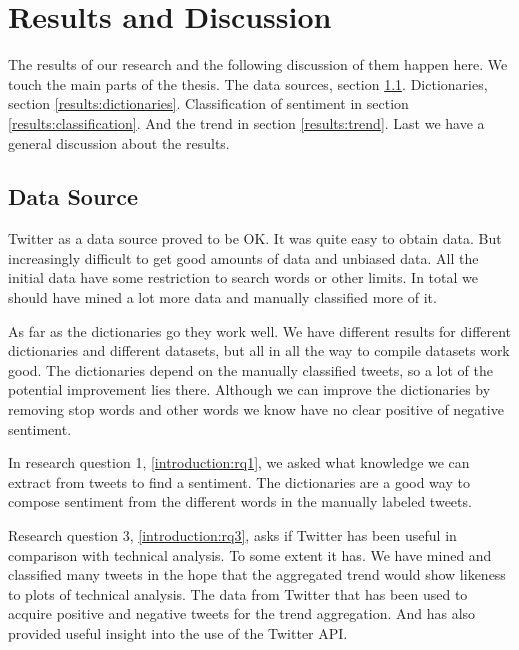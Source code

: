 \chapter{Results and Discussion}\label{results}

The results of our research and the following discussion of them happen here.
We touch the main parts of the thesis. The data sources, section
\ref{results:data_sources}. Dictionaries, section \ref{results:dictionaries}. Classification of sentiment in section
\ref{results:classification}. And the trend in section \ref{results:trend}.
Last we have a general discussion about the results. 
%

\section{Data Source}\label{results:data_sources}
Twitter as a data source proved to be OK. It was quite easy to obtain data. But
increasingly difficult to get good amounts of data and unbiased data. All the
initial data have some restriction to search words or other limits. In total we
should have mined a lot more data and manually classified more of it. 

As far as the dictionaries go they work well. We have different results for
different dictionaries and different datasets, but all in all the way to
compile datasets work good. The dictionaries depend on the manually classified
tweets, so a lot of the potential improvement lies there. Although we can
improve the dictionaries by removing stop words and other words we know have no
clear positive of negative sentiment. 

In research question 1, \ref{introduction:rq1}, we asked what knowledge we can
extract from tweets to find a sentiment. The dictionaries are a good way to
compose sentiment from the different words in the manually labeled tweets.

Research question 3, \ref{introduction:rq3}, asks if Twitter has been useful in
comparison with technical analysis. To some  extent it has. We have mined and
classified many tweets in the hope that the aggregated trend would show
likeness to plots of technical analysis. The data from Twitter that has been
used to acquire positive and negative tweets for the trend aggregation. And has
also provided useful insight into the use of the Twitter API. 
%

